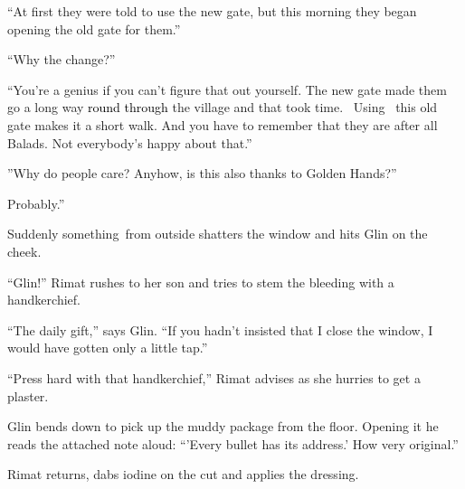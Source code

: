 \documentclass[letterpaper]{article}
\begin{document}
\textcolor[rgb]{0.13333334,0.13333334,0.13333334}{{}``}At first\textcolor[rgb]{0.13333334,0.13333334,0.13333334}{ they
were told to use the new gate, but this morning they began opening the old gate for them.'' }

\textcolor[rgb]{0.13333334,0.13333334,0.13333334}{{}``Why}\textcolor[rgb]{0.0,0.4392157,0.7529412}{
}\textcolor[rgb]{0.13333334,0.13333334,0.13333334}{the change?'' }

{}``You're a genius if you can't figure that out yourself. The new gate made them go a long way \textcolor{black}{round
through }the village and that took time. \ Using \ this old gate makes it a short walk. And you have to remember that
they are after all Balads. Not everybody's happy about that.''\textcolor[rgb]{0.13333334,0.13333334,0.13333334}{ }

\textcolor[rgb]{0.13333334,0.13333334,0.13333334}{{}''Why do people care? Anyhow, is this }also
\textcolor[rgb]{0.13333334,0.13333334,0.13333334}{thanks to }Golden
Hands\textcolor[rgb]{0.13333334,0.13333334,0.13333334}{?''}

\textcolor[rgb]{0.13333334,0.13333334,0.13333334}{{\textquotedbl}Probably.''}

\textcolor[rgb]{0.13333334,0.13333334,0.13333334}{Suddenly something~from outside shatters the window and hits Glin on
the cheek.}

\textcolor[rgb]{0.13333334,0.13333334,0.13333334}{{}``Glin!'' Rimat rushes to her son and tries to stem the bleeding
with a handkerchief. }

\textcolor[rgb]{0.13333334,0.13333334,0.13333334}{{}``The daily gift,'' says Glin. ``If you hadn't insisted }that
\textcolor[rgb]{0.13333334,0.13333334,0.13333334}{I close the window, I would have gotten only a }little
tap\textcolor[rgb]{0.13333334,0.13333334,0.13333334}{.'' }

\textcolor[rgb]{0.13333334,0.13333334,0.13333334}{{}``Press hard with }that
handkerchief,\textcolor[rgb]{0.13333334,0.13333334,0.13333334}{{}'' Rimat advises as she hurries to get
a}\textcolor[rgb]{0.0,0.4392157,0.7529412}{ }plaster.

\textcolor[rgb]{0.13333334,0.13333334,0.13333334}{Glin bends down to pick up the muddy
}package\textcolor[rgb]{0.13333334,0.13333334,0.13333334}{ from the floor. Opening it he reads the attached note aloud:
``'Every bullet has its address.' How }very\textcolor[rgb]{0.0,0.4392157,0.7529412}{
}\textcolor[rgb]{0.13333334,0.13333334,0.13333334}{original.''}

\textcolor[rgb]{0.13333334,0.13333334,0.13333334}{Rimat returns, dabs iodine on the cut and }applies the
dressing\textcolor[rgb]{0.0,0.4392157,0.7529412}{. }
\end{document}
